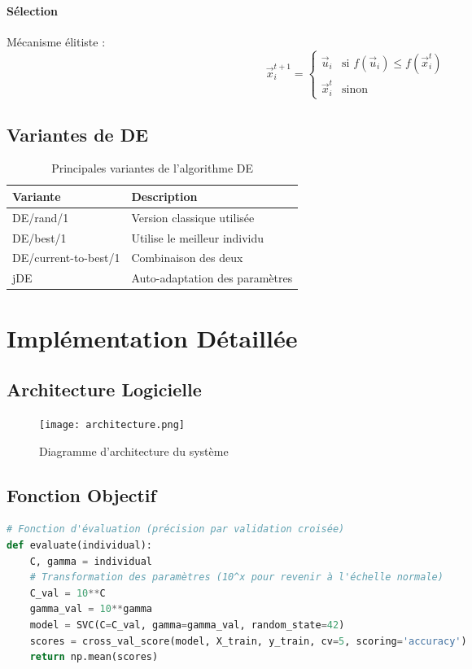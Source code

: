 \documentclass[a4paper, 12pt]{article}
\begin{document}
\paragraph{Sélection} Mécanisme élitiste :
\[ \vec{x}_i^{t+1} = \begin{cases} 
\vec{u}_i & \text{si } f(\vec{u}_i) \leq f(\vec{x}_i^t) \\
\vec{x}_i^t & \text{sinon}
\end{cases} \]


\subsection{Variantes de DE}
\begin{table}[H]
\centering
\begin{tabular}{@{}ll@{}}
\toprule
\textbf{Variante} & \textbf{Description} \\
\midrule
DE/rand/1 & Version classique utilisée \\
DE/best/1 & Utilise le meilleur individu \\
DE/current-to-best/1 & Combinaison des deux \\
jDE & Auto-adaptation des paramètres \\
\bottomrule
\end{tabular}
\caption{Principales variantes de l'algorithme DE}
\end{table}

\section{Implémentation Détaillée}
\subsection{Architecture Logicielle}
\begin{figure}[H]
\centering
\texttt{[image: architecture.png]}
\caption{Diagramme d'architecture du système}
\label{fig:enter-label}
\end{figure}


\subsection{Fonction Objectif}
\begin{lstlisting}[language=Python]
# Fonction d'évaluation (précision par validation croisée)
def evaluate(individual):
    C, gamma = individual
    # Transformation des paramètres (10^x pour revenir à l'échelle normale)
    C_val = 10**C
    gamma_val = 10**gamma
    model = SVC(C=C_val, gamma=gamma_val, random_state=42)
    scores = cross_val_score(model, X_train, y_train, cv=5, scoring='accuracy')
    return np.mean(scores)
\end{lstlisting}
\end{document}
